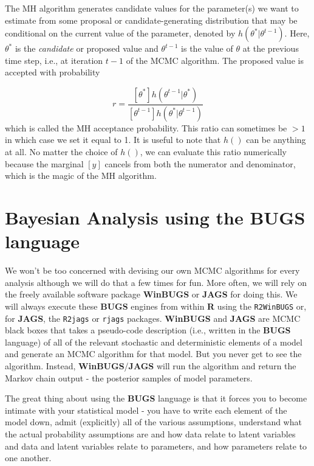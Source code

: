 The MH algorithm generates candidate values for the parameter(s) we want to estimate from some
proposal or candidate-generating distribution that may be conditional
on the current value of the parameter, denoted by
$h(\theta^{*}|\theta^{t-1})$. Here, $\theta^{*}$ is the {\it candidate}
or proposed
value and $\theta^{t-1}$ is the value of $\theta$ at the previous time step, i.e., at iteration $t-1$ of
the MCMC algorithm.  The proposed value
is accepted with probability

\[
r = \frac{ [\theta^{*}] h(\theta^{t-1}|\theta^{*})}
    { [\theta^{t-1}] h(\theta^{*}|\theta^{t-1}) }
\]
which is called the MH acceptance probability.
This ratio can sometimes be $>1$ in which case we set it equal to
1. It is useful to note that $h()$ can be anything at all. No matter
the choice of $h()$, we can evaluate this ratio numerically because
the marginal $[y]$ cancels from both the numerator and
denominator, which is the magic of the MH algorithm.


\section{Bayesian Analysis using the BUGS language}

We won't be too concerned with devising our own MCMC algorithms for
every analysis
although we will do that a few times for fun.  More often, we
will rely on the freely available software package {\bf WinBUGS} or
{\bf JAGS}
for doing this.  We will always execute these {\bf BUGS} engines from
within {\bf R} using the \mbox{\tt R2WinBUGS} \citep{sturtz_etal:2005}
or, for {\bf JAGS}, the  \mbox{\tt R2jags} \citep{su_yajima:2011} or 
\mbox{\tt rjags} \citep{plummer:2009} packages. 
{\bf WinBUGS} and {\bf JAGS} are  MCMC black boxes
that takes a pseudo-code description (i.e., written in the {\bf BUGS}
language) of all of the relevant stochastic
and deterministic elements of a model and generate an MCMC algorithm
for that model. But you never get to see the algorithm. Instead,
{\bf WinBUGS}/{\bf JAGS} will run the 
algorithm and  return the Markov chain output
- the posterior samples of model parameters.

The great thing about using the {\bf BUGS} language is that it forces
you to become intimate with your statistical model - you have to write
each element of the model down, admit (explicitly) all of the various
assumptions, understand what the actual probability assumptions are
and how data relate to latent variables and data and latent variables
relate to parameters, and how parameters relate to one another.

